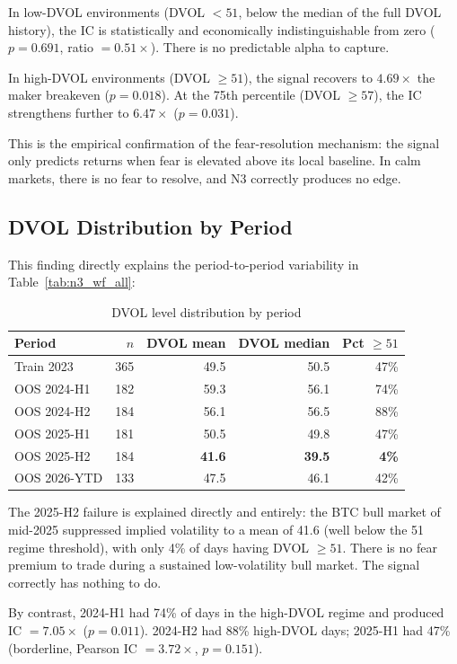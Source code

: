 \documentclass[12pt, a4paper]{article}
\theoremstyle{plain}
\theoremstyle{definition}
\begin{document}
In low-DVOL environments (DVOL $< 51$, below the median of the full DVOL
history), the IC is statistically and economically indistinguishable from zero
($p = 0.691$, ratio $= 0.51\times$). There is no predictable alpha to capture.

In high-DVOL environments (DVOL $\geq 51$), the signal recovers to $4.69\times$
the maker breakeven ($p = 0.018$). At the 75th percentile (DVOL $\geq 57$),
the IC strengthens further to $6.47\times$ ($p = 0.031$).

This is the empirical confirmation of the fear-resolution mechanism: the
signal only predicts returns when fear is elevated above its local baseline.
In calm markets, there is no fear to resolve, and N3 correctly produces no edge.

\subsection{DVOL Distribution by Period}

This finding directly explains the period-to-period variability in
Table~\ref{tab:n3_wf_all}:

\begin{table}[H]
\centering
\caption{DVOL level distribution by period}
\label{tab:dvol_dist}
\begin{tabular}{lrrrr}
\toprule
Period & $n$ & DVOL mean & DVOL median & Pct $\geq 51$ \\
\midrule
Train 2023   & 365 & 49.5 & 50.5 & 47\% \\
OOS 2024-H1  & 182 & 59.3 & 56.1 & 74\% \\
OOS 2024-H2  & 184 & 56.1 & 56.5 & 88\% \\
OOS 2025-H1  & 181 & 50.5 & 49.8 & 47\% \\
OOS 2025-H2  & 184 & \textbf{41.6} & \textbf{39.5} & \textbf{4\%} \\
OOS 2026-YTD & 133 & 47.5 & 46.1 & 42\% \\
\bottomrule
\end{tabular}
\end{table}

The 2025-H2 failure is explained directly and entirely: the BTC bull market
of mid-2025 suppressed implied volatility to a mean of 41.6 (well below
the 51 regime threshold), with only 4\% of days having DVOL $\geq 51$.
There is no fear premium to trade during a sustained low-volatility
bull market. The signal correctly has nothing to do.

By contrast, 2024-H1 had 74\% of days in the high-DVOL regime and produced
IC $= 7.05\times$ ($p = 0.011$). 2024-H2 had 88\% high-DVOL days; 2025-H1
had 47\% (borderline, Pearson IC $= 3.72\times$, $p = 0.151$).
\end{document}
